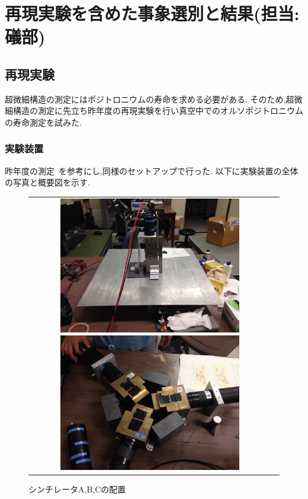 \chapter{再現実験を含めた事象選別と結果(担当:礒部)}\label{result}

\section{再現実験}\label{replication}
超微細構造の測定にはポジトロニウムの寿命を求める必要がある.
そのため,超微細構造の測定に先立ち昨年度の再現実験を行い真空中でのオルソポジトロニウムの寿命測定を試みた.

\subsection{実験装置}
昨年度の測定~\cite{卒業論文2015}を参考にし,同様のセットアップで行った.
以下に実験装置の全体の写真と概要図を示す.
\begin{figure}[htbp]
	\begin{tabular}{cc}
		\begin{minipage}{0.5\hsize}
			\centering
				\includegraphics[width=80mm]{img/isb/setting_overview.JPG}
				\caption{装置の全体写真}
				\label{fig:setting2015}
		\end{minipage}
		\begin{minipage}{0.5\hsize}
			\centering
			\includegraphics[width=80mm]{img/isb/pmt_setting.JPG}
				\caption{シンチレータA,B,Cの配置}
				\label{fig:pmt_setting2015}
		\end{minipage}
	\end{tabular}
\end{figure}

